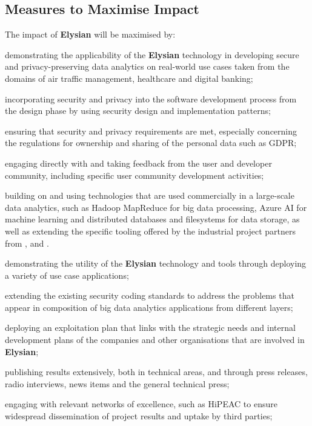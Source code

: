 \documentclass[a4paper,11pt]{article}
\newcommand{\project}[1]{\textbf{#1}\xspace}
\newcommand{\SECURITY}{\project{Elysian}}
\newcommand{\TheProject}{\SECURITY}
\begin{document}
\subsection{Measures to Maximise Impact}
The impact of \TheProject{} will be maximised by:
\begin{inparaenum}[i)]
\item
demonstrating the applicability of the \TheProject{} technology in developing secure and privacy-preserving data analytics on real-world use cases taken from the domains of air traffic management, healthcare
and digital banking; %
\item
incorporating security and privacy into the software development process from the design phase by using security design and implementation patterns;
\item
ensuring that security and privacy requirements are met, especially concerning the regulations for ownership and sharing of the personal data such as GDPR;
\item
engaging directly with and taking feedback from the user and developer community, including specific user community development activities;
\item
building on and using technologies that are used commercially in a large-scale data analytics, such as Hadoop MapReduce for big data processing, Azure AI for machine learning and distributed databases and filesystems for data storage, as well as extending the specific tooling offered by the industrial project partners from \IBMshort{}, \YAGshort{} and \COGNIshort{}.
\item
demonstrating the utility of the \TheProject{} technology and tools through deploying a variety of use case applications;
\item
extending the existing security coding standards to address the problems that appear in composition of big data analytics applications from different layers;
\item
deploying an exploitation plan that links with the strategic needs and internal development plans of the companies and other organisations that are involved in \TheProject;
\item
publishing results extensively, both in technical areas, and through press releases, radio interviews, news items and the general technical press;
\item
engaging with relevant networks of excellence, such as HiPEAC to ensure widespread dissemination of
project results and uptake by third parties;
\item

\end{inparaenum}
\end{document}
